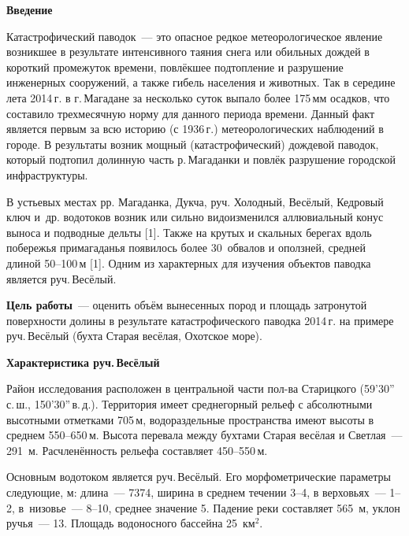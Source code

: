 \bigskip
{}



\makeProcTitleSchool



\textbf{Введение}

Катастрофический паводок~--- это опасное редкое метеорологическое явление возникшее в результате интенсивного таяния снега или обильных дождей в короткий промежуток времени, повлёкшее подтопление и разрушение инженерных сооружений, а также гибель населения и животных. Так в середине лета 2014\,г. в г.\,Магадане за несколько суток выпало более 175\,мм осадков, что составило трехмесячную норму для данного периода времени. Данный факт является первым за всю историю (с 1936\,г.) метеорологических наблюдений в городе. В результаты возник мощный (катастрофический) дождевой паводок, который подтопил долинную часть р.\,Магаданки и повлёк разрушение городской инфраструктуры.

В устьевых местах рр. Магаданка, Дукча, руч. Холодный, Весёлый, Кедровый ключ и~др. водотоков возник или сильно видоизменился аллювиальный конус выноса и подводные дельты [1]. Также на крутых и скальных берегах вдоль побережья примагаданья появилось более 30 обвалов и оползней, средней длиной 50--100\,м [1]. Одним из характерных для изучения объектов паводка является руч.\,Весёлый.

\textbf{Цель работы}~--- оценить объём вынесенных пород и площадь затронутой поверхности долины в результате катастрофического паводка 2014\,г. на примере руч.\,Весёлый (бухта Старая весёлая, Охотское море).

\textbf{Характеристика руч.\,Весёлый}

Район исследования расположен в центральной части пол-ва Старицкого (59’30”\,с.\,ш., 150’30”\,в.\,д.). Территория имеет среднегорный рельеф с абсолютными высотными отметками 705\,м, водораздельные пространства имеют высоты в среднем 550--650\,м. Высота перевала между бухтами Старая весёлая и Светлая~--- 291 м. Расчленённость рельефа составляет 450--550\,м.

Основным водотоком является руч.\,Весёлый. Его морфометрические параметры следующие, м: длина~--- 7374, ширина в среднем течении 3--4, в верховьях~--- 1--2, в низовье~--- 8--10, среднее значение 5. Падение реки составляет 565~м, уклон ручья~--- 13. Площадь водоносного бассейна 25~км$^2$.

